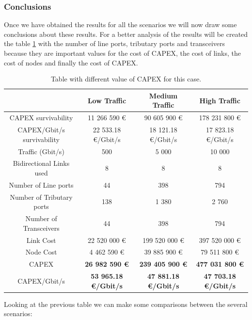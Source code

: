 \vspace{15pt}
\subsubsection{Conclusions}

Once we have obtained the results for all the scenarios we will now draw some conclusions about these results. For a better analysis of the results will be created the table \ref{table_comparative_opaque_protec} with the number of line ports, tributary ports and transceivers because they are important values for the cost of CAPEX, the cost of links, the cost of nodes and finally the cost of CAPEX.\\

\begin{table}[h!]
\centering
\begin{tabular}{| c | c | c | c |}
 \hline
  & Low Traffic & Medium Traffic  & High Traffic \\
 \hline\hline
 CAPEX survivability & 11 266 590 \euro & 90 605 900 \euro & 178 231 800 \euro \\ \hline
 CAPEX/Gbit/s survivability & 22 533.18 \euro/Gbit/s & 18 121.18 \euro/Gbit/s & 17 823.18 \euro/Gbit/s \\ \hline
 Traffic (Gbit/s) & 500 & 5 000 & 10 000 \\ \hline
 Bidirectional Links used & 8 & 8 & 8 \\ \hline
 Number of Line ports & 44 & 398 & 794 \\ \hline
 Number of Tributary ports & 138 & 1 380 & 2 760 \\ \hline
 Number of Transceivers & 44 & 398 & 794 \\ \hline
 Link Cost & 22 520 000 \euro & 199 520 000 \euro & 397 520 000 \euro \\ \hline
 Node Cost & 4 462 590 \euro & 39 885 900 \euro & 79 511 800 \euro \\ \hline
 CAPEX & \textbf{26 982 590 \euro} & \textbf{239 405 900 \euro} & \textbf{477 031 800 \euro} \\ \hline
 CAPEX/Gbit/s & \textbf{53 965.18 \euro/Gbit/s} & \textbf{47 881.18 \euro/Gbit/s} & \textbf{47 703.18 \euro/Gbit/s}\\ \hline
\end{tabular}
\caption{Table with different value of CAPEX for this case.}
\label{table_comparative_opaque_protec}
\end{table}


Looking at the previous table we can make some comparisons between the several scenarios:

